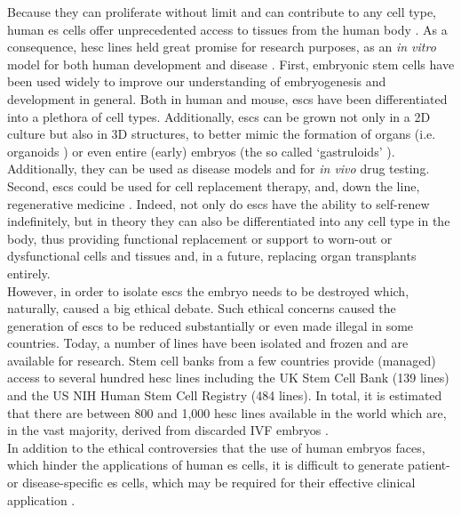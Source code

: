 Because they can proliferate without limit and can contribute to any cell type, human \gls{es} cells offer unprecedented access to tissues from the human body \cite{department2006regenerative}. 
As a consequence, \gls{hesc} lines held great promise for research purposes, as an \textit{in vitro} model for both human development and disease \cite{saha2009technical}.
First, embryonic stem cells have been used widely to improve our understanding of embryogenesis and development in general. 
Both in human and mouse, \glspl{esc} have been differentiated into a plethora of cell types.
Additionally, \glspl{esc} can be grown not only in a 2D culture but also in 3D structures, to better mimic the formation of organs (i.e. organoids \cite{clevers2016modeling, lancaster2013cerebral}) or even entire (early) embryos (the so called `gastruloids' \cite{van2020single2}). 
Additionally, they can be used as disease models and for \textit{in vivo} drug testing.\\

Second, \glspl{esc} could be used for cell replacement therapy, and, down the line, regenerative medicine \cite{kimbrel2015current}.
Indeed, not only do \glspl{esc} have the ability to self-renew indefinitely, but in theory they can also be differentiated into any cell type in the body, thus providing functional replacement or support to worn-out or dysfunctional cells and tissues and, in a future, replacing organ transplants entirely. \\

However, in order to isolate \glspl{esc} the embryo needs to be destroyed which, naturally, caused a big ethical debate.
Such ethical concerns caused the generation of \glspl{esc} to be reduced substantially or even made illegal in some countries.
Today, a number of lines have been isolated and frozen and are available for research.
Stem cell banks from a few countries provide (managed) access to several hundred \gls{hesc} lines including the UK Stem Cell Bank (139 lines) and the US NIH Human Stem Cell Registry (484 lines).
In total, it is estimated that there are between 800 and 1,000 \gls{hesc} lines available in the world which are, in the vast majority, derived from discarded IVF embryos \cite{isasi2009governing}. \\

In addition to the ethical controversies that the use of human embryos faces, which hinder the applications of human \gls{es} cells, it is difficult to generate patient- or disease-specific \gls{es} cells, which may be required for their effective clinical application \cite{yamanaka2007strategies}.


